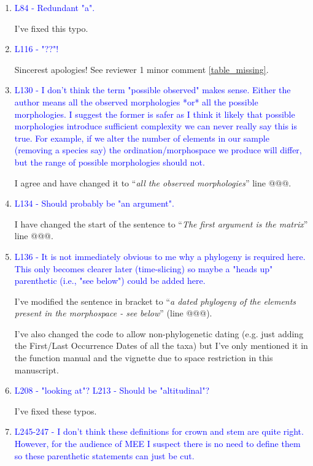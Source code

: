 \documentclass[12pt,letterpaper]{article}
\begin{document}
\begin{enumerate}
\item{\textcolor{blue}{L84 - Redundant "a".}}

I've fixed this typo.

\item{\textcolor{blue}{L116 - "??"!}}

Sincerest apologies! See reviewer 1 minor comment \ref{table_missing}.

\item{\textcolor{blue}{L130 - I don't think the term "possible observed" makes sense. Either the author means all the observed morphologies *or* all the possible morphologies. I suggest the former is safer as I think it likely that possible morphologies introduce sufficient complexity we can never really say this is true. For example, if we alter the number of elements in our sample (removing a species say) the ordination/morphospace we produce will differ, but the range of possible morphologies should not.}}

I agree and have changed it to ``\textit{all the observed morphologies}'' line @@@.

\item{\textcolor{blue}{L134 - Should probably be "an argument".}}

I have changed the start of the sentence to ``\textit{The first argument is the matrix}'' line @@@.

\item{\textcolor{blue}{L136 - It is not immediately obvious to me why a phylogeny is required here. This only becomes clearer later (time-slicing) so maybe a "heads up" parenthetic (i.e., "see below") could be added here.}}

I've modified the sentence in bracket to
``\textit{a dated phylogeny of the elements present in the morphospace - see below}'' (line @@@).

I've also changed the code to allow non-phylogenetic dating (e.g. just adding the First/Last Occurrence Dates of all the taxa) but I've only mentioned it in the function manual and the vignette due to space restriction in this manuscript.

\item{\textcolor{blue}{L208 - "looking at"? L213 - Should be "altitudinal"?}}
\label{altitude}

I've fixed these typos.

\item{\textcolor{blue}{L245-247 - I don't think these definitions for crown and stem are quite right. However, for the audience of MEE I suspect there is no need to define them so these parenthetic statements can just be cut.}}


\end{enumerate}
\end{document}
